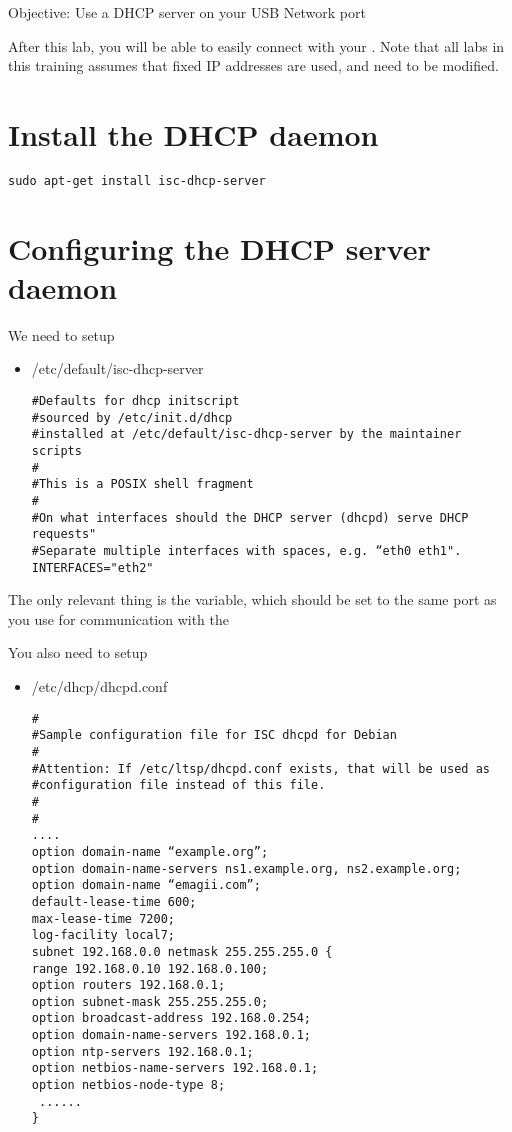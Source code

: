 {Objective: Use a DHCP server on your USB Network port}

After this lab, you will be able to easily connect with your \devboard.
Note that all labs in this training assumes that fixed IP addresses
are used, and need to be modified.

\section{Install the DHCP daemon}

\begin{verbatim}
sudo apt-get install isc-dhcp-server
\end{verbatim}



\section{Configuring the DHCP server daemon}

We need to setup

\begin{itemize}
\item /etc/default/isc-dhcp-server

\begin{verbatim}
#Defaults for dhcp initscript
#sourced by /etc/init.d/dhcp
#installed at /etc/default/isc-dhcp-server by the maintainer scripts
#
#This is a POSIX shell fragment
#
#On what interfaces should the DHCP server (dhcpd) serve DHCP requests"
#Separate multiple interfaces with spaces, e.g. “eth0 eth1".
INTERFACES="eth2"
\end{verbatim}
\end{itemize}

The only relevant thing is the  variable, which should be set
to the same port as you use for communication with the \devboard

\clearpage

You also need to setup

\begin{itemize}
\item /etc/dhcp/dhcpd.conf

\begin{verbatim}
#
#Sample configuration file for ISC dhcpd for Debian
#
#Attention: If /etc/ltsp/dhcpd.conf exists, that will be used as
#configuration file instead of this file.
#
#
....
option domain-name “example.org”;
option domain-name-servers ns1.example.org, ns2.example.org;
option domain-name “emagii.com”;
default-lease-time 600;
max-lease-time 7200;
log-facility local7;
subnet 192.168.0.0 netmask 255.255.255.0 {
range 192.168.0.10 192.168.0.100;
option routers 192.168.0.1;
option subnet-mask 255.255.255.0;
option broadcast-address 192.168.0.254;
option domain-name-servers 192.168.0.1;
option ntp-servers 192.168.0.1;
option netbios-name-servers 192.168.0.1;
option netbios-node-type 8;
 ......
}
\end{verbatim}
\end{itemize}


